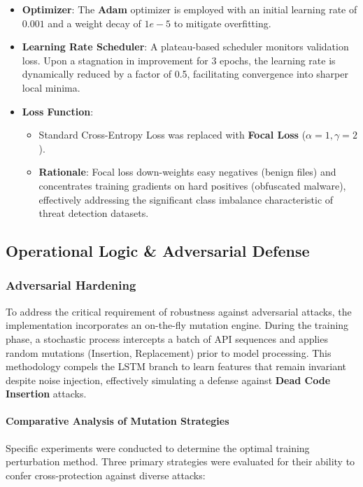 \begin{itemize}
    \item \textbf{Optimizer}: The \textbf{Adam} optimizer is employed with an initial learning rate of $0.001$ and a weight decay of $1e-5$ to mitigate overfitting.
    \item \textbf{Learning Rate Scheduler}: A plateau-based scheduler monitors validation loss. Upon a stagnation in improvement for 3 epochs, the learning rate is dynamically reduced by a factor of 0.5, facilitating convergence into sharper local minima.
    \item \textbf{Loss Function}:
    \begin{itemize}
        \item Standard Cross-Entropy Loss was replaced with \textbf{Focal Loss} ($\alpha=1, \gamma=2$).
        \item \textbf{Rationale}: Focal loss down-weights easy negatives (benign files) and concentrates training gradients on hard positives (obfuscated malware), effectively addressing the significant class imbalance characteristic of threat detection datasets.
    \end{itemize}
\end{itemize}

\subsection{Operational Logic \& Adversarial Defense}

\subsubsection{Adversarial Hardening}
To address the critical requirement of robustness against adversarial attacks, the implementation incorporates an on-the-fly mutation engine. During the training phase, a stochastic process intercepts a batch of API sequences and applies random mutations (Insertion, Replacement) prior to model processing. This methodology compels the LSTM branch to learn features that remain invariant despite noise injection, effectively simulating a defense against \textbf{Dead Code Insertion} attacks.

\paragraph{Comparative Analysis of Mutation Strategies}
Specific experiments were conducted to determine the optimal training perturbation method. Three primary strategies were evaluated for their ability to confer cross-protection against diverse attacks:

